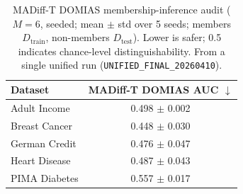 \begin{table}[!t]
\centering
\caption{MADiff-T DOMIAS membership-inference audit
($M=6$, seeded; mean $\pm$ std over 5 seeds; members $D_{\text{train}}$,
non-members $D_{\text{test}}$). Lower is safer; 0.5 indicates
chance-level distinguishability. From a single unified run
(\texttt{UNIFIED\_FINAL\_20260410}).}
\label{tab:results_domias}
\scriptsize
\setlength{\tabcolsep}{5.5pt}
\renewcommand{\arraystretch}{1.15}
\begin{tabular}{l|c}
\rowcolor{gray!20}
\textbf{Dataset} & \textbf{MADiff-T DOMIAS AUC $\downarrow$} \\
\hline
Adult Income & 0.498 $\pm$ 0.002 \\
Breast Cancer & 0.448 $\pm$ 0.030 \\
German Credit & 0.476 $\pm$ 0.047 \\
Heart Disease & 0.487 $\pm$ 0.043 \\
PIMA Diabetes & 0.557 $\pm$ 0.017 \\
\end{tabular}
\end{table}
